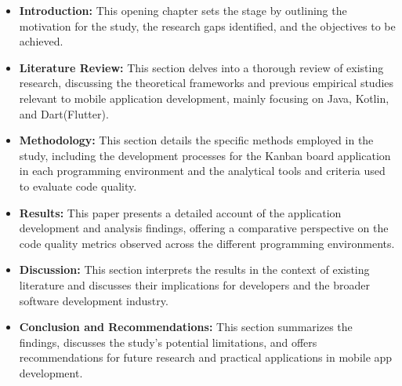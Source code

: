 \begin{itemize}
    \item \textbf{Introduction:} This opening chapter sets the stage by outlining the motivation for the study, the research gaps identified, and the objectives to be achieved.
    \item \textbf{Literature Review:} This section delves into a thorough review of existing research, discussing the theoretical frameworks and previous empirical studies relevant to mobile application development, mainly focusing on Java, Kotlin, and Dart(Flutter).
    \item \textbf{Methodology:} This section details the specific methods employed in the study, including the development processes for the Kanban board application in each programming environment and the analytical tools and criteria used to evaluate code quality. 
    \item \textbf{Results:} This paper presents a detailed account of the application development and analysis findings, offering a comparative perspective on the code quality metrics observed across the different programming environments.
    \item \textbf{Discussion:} This section interprets the results in the context of existing literature and discusses their implications for developers and the broader software development industry.
    \item \textbf{Conclusion and Recommendations:} This section summarizes the findings, discusses the study’s potential limitations, and offers recommendations for future research and practical applications in mobile app development.
\end{itemize}
